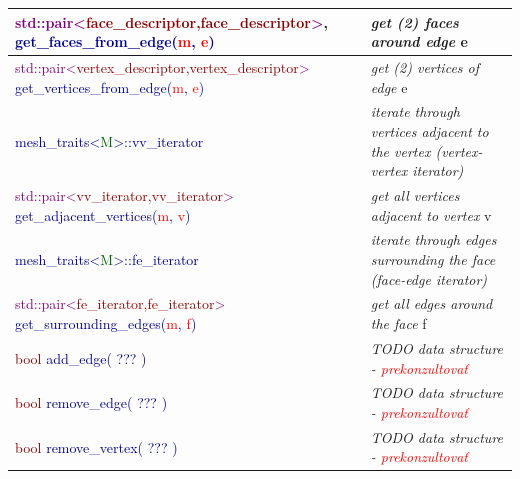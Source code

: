\documentclass{article}
\begin{document}
\begin{itemize}
\begin{table}[!h]
\begin{tabular}{| p{} | p{} |}
\textsf{\textcolor{purple}{std::pair\textless\textcolor{darkred}{face\_descriptor,face\_descriptor}\textgreater}, \hspace*{2.5px} \textcolor{darkblue}{get\_faces\_from\_edge(\textcolor{red}{m}, \textcolor{red}{e})}} &  \emph{get (2) faces around edge} \textsf{e} \\ \hline

\textsf{\textcolor{purple}{std::pair\textless\textcolor{darkred}{vertex\_descriptor,vertex\_descriptor}\textgreater}\, \hspace*{2.5px} \textcolor{darkblue}{get\_vertices\_from\_edge(\textcolor{red}{m}, \textcolor{red}{e})}} &  \emph{get (2) vertices of edge} \textsf{e} \\ \hline

\textsf{\textcolor{darkblue}{mesh\_traits\textless\textcolor{darkgreen}{M}\textgreater ::vv\_iterator}} & \emph{iterate through vertices adjacent to the vertex (vertex-vertex iterator)} \\ \hline

\textsf{\textcolor{purple}{std::pair\textless\textcolor{darkred}{vv\_iterator,vv\_iterator}\textgreater}\, \hspace*{2.5px} \textcolor{darkblue}{get\_adjacent\_vertices(\textcolor{red}{m}, \textcolor{red}{v})}} &  \emph{get all vertices adjacent to vertex} \textsf{v} \\ \hline

\textsf{\textcolor{darkblue}{mesh\_traits\textless\textcolor{darkgreen}{M}\textgreater ::fe\_iterator}} & \emph{iterate through edges surrounding the face (face-edge iterator)} \\ \hline

\textsf{\textcolor{purple}{std::pair\textless\textcolor{darkred}{fe\_iterator,fe\_iterator}\textgreater}\, \hspace*{2.5px} \textcolor{darkblue}{get\_surrounding\_edges(\textcolor{red}{m}, \textcolor{red}{f})}} &  \emph{get all edges around the face} \textsf{f} \\ \hline

\textsf{\textcolor{darkred}{bool} \textcolor{darkblue}{add\_edge( ??? )}} & \emph{TODO data structure - \textcolor{red}{prekonzultovať}} \\ \hline

\textsf{\textcolor{darkred}{bool} \textcolor{darkblue}{remove\_edge( ??? )}} & \emph{TODO data structure - \textcolor{red}{prekonzultovať}} \\ \hline

\textsf{\textcolor{darkred}{bool} \textcolor{darkblue}{remove\_vertex( ??? )}} & \emph{TODO data structure - \textcolor{red}{prekonzultovať}} \\ \hline

\end{tabular}
\end{table}


\end{itemize}
\end{document}
